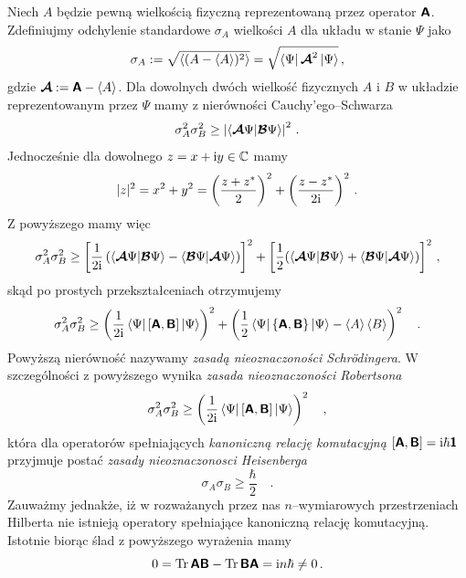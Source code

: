 \documentclass{myclass}
\begin{document}
Niech \(A\) będzie pewną wielkością fizyczną reprezentowaną przez operator \(\boldsymbol{\mathsf{A}}\). Zdefiniujmy
odchylenie standardowe \(\sigma_A\) wielkości \(A\) dla układu w stanie \(\Psi\) jako
\begin{equation*}
    \sigma_A := \sqrt{\expval{(A - \expval{A})^2}} = \sqrt{\bra{\Psi}\boldsymbol{\mathsf{\mathcal{A}}}^2\ket{\Psi}}\,,
\end{equation*}
gdzie \(\boldsymbol{\mathsf{\mathcal{A}}} := \boldsymbol{\mathsf{A}} - \expval{A}\). Dla dowolnych dwóch wielkość fizycznych \(A\)
i \(B\) w układzie reprezentowanym przez \(\Psi\) mamy z nierówności Cauchy'ego--Schwarza
\begin{equation*}
    \sigma_A^2\sigma_B^2 \geq \left|\braket{\boldsymbol{\mathsf{\mathcal{A}}}\Psi}{\boldsymbol{\mathsf{\mathcal{B}}}\Psi}\right|^2\,.
\end{equation*}
Jednocześnie dla dowolnego \(z = x + \mathrm{i} y \in\mathbb{C}\) mamy
\begin{equation*}
    |z|^2 = x^2 + y^2 = \left(\frac{z + z^*}{2}\right)^2 + \left(\frac{z-z^*}{2\mathrm{i}}\right)^2\,.
\end{equation*}
Z powyższego mamy więc
\begin{equation*}
    \sigma_A^2\sigma_B^2 \geq \left[\frac{1}{2\mathrm{i}}\left(\braket{\boldsymbol{\mathsf{\mathcal{A}}}\Psi}{\boldsymbol{\mathsf{\mathcal{B}}}\Psi} - \braket{\boldsymbol{\mathsf{\mathcal{B}}}\Psi}{\boldsymbol{\mathsf{\mathcal{A}}}\Psi}\right)\right]^2 + \left[\frac{1}{2}(\braket{\boldsymbol{\mathsf{\mathcal{A}}}\Psi}{\boldsymbol{\mathsf{\mathcal{B}}}\Psi} + \braket{\boldsymbol{\mathsf{\mathcal{B}}}\Psi}{\boldsymbol{\mathsf{\mathcal{A}}}\Psi})\right]^2\,,
\end{equation*}
skąd po prostych przekształceniach otrzymujemy
\begin{equation*}
    \sigma_A^2\sigma_B^2 \geq \left(\frac{1}{2\mathrm{i}}\bra{\Psi}[\boldsymbol{\mathsf{A}},\boldsymbol{\mathsf{B}}]\ket{\Psi}\right)^2 + \left(\frac{1}{2}\bra{\Psi}\{\boldsymbol{\mathsf{A}},\boldsymbol{\mathsf{B}}\}\ket{\Psi} - \expval{A}\expval{B}\right)^2
    \quad.
\end{equation*}
Powyższą nierówność nazywamy \textit{zasadą nieoznaczoności Schr\"{o}dingera}. W szczególności z
powyższego wynika \textit{zasada nieoznaczoności Robertsona}
\begin{equation*}
    \sigma_A^2\sigma_B^2 \geq \left(\frac{1}{2\mathrm{i}}\bra{\Psi}[\boldsymbol{\mathsf{A}},\boldsymbol{\mathsf{B}}]\ket{\Psi}\right)^2
    \quad,
\end{equation*}
która dla operatorów spełniających \textit{kanoniczną relację komutacyjną} \([\boldsymbol{\mathsf{A}},\boldsymbol{\mathsf{B}}] =
\mathrm{i}\hbar\boldsymbol{\mathsf{1}}\) przyjmuje postać \textit{zasady nieoznaczonosci Heisenberga}
\begin{equation*}
    \sigma_A\sigma_B \geq \frac{\hbar}{2}\quad.
\end{equation*}
Zauważmy jednakże, iż w rozważanych przez nas \(n\)--wymiarowych przestrzeniach Hilberta nie
istnieją operatory spełniające kanoniczną relację komutacyjną. Istotnie biorąc ślad z powyższego
wyrażenia mamy
\begin{equation*}
    0 = \Tr \boldsymbol{\mathsf{AB}} - \Tr\boldsymbol{\mathsf{BA}} = \mathrm{i} n\hbar \neq 0\,.
\end{equation*}
\end{document}
